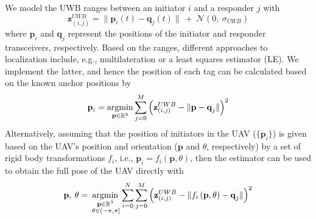 We model the UWB ranges between an initiator $i$ and a responder $j$ with
\begin{equation}
    \textbf{z}^{UWB}_{(i,j)} = \lVert \textbf{p}_i(t)-\textbf{q}_j(t) \lVert\:+\: \mathcal{N}\left(0,\:\sigma_{UWB}\right)
\end{equation}
where $\textbf{p}_i$ and $\textbf{q}_j$ represent the positions of the initiator and responder transceivers, respectively. Based on the ranges, different approaches to localization include, e.g., multilateration or a least squares estimator (LE). We implement the latter, and hence the position of each tag can be calculated based on the known anchor positions by
\begin{equation}
    \textbf{p}_{i} = \operatorname*{argmin}_{\textbf{p}\in\mathbb{R}^3} \displaystyle\sum_{j=0}^{M} \left(\textbf{z}^{UWB}_{(i,j)} - \lVert \textbf{p} - \textbf{q}_j \lVert \right)^2 
\end{equation}
Alternatively, assuming that the position of initiators in the UAV ($\{\textbf{p}_i\}$) is given based on the UAV's position and orientation ($\textbf{p}$ and $\theta$, respectively) by a set of rigid body transformations $f_i$, i.e., $\textbf{p}_i = f_i\left(\textbf{p}, \theta\right)$, then the estimator can be used to obtain the full pose of the UAV directly with
\begin{equation}
    \textbf{p}, \:\theta = \operatorname*{argmin}_{\substack{\textbf{p}\in\mathbb{R}^3\\\:\theta\in(-\pi,\pi]}} \displaystyle\sum_{i=0}^{N}\displaystyle\sum_{j=0}^{M} \left(\textbf{z}^{UWB}_{(i,j)} - \lVert f_i\left(\textbf{p}, \theta\right) - \textbf{q}_j \lVert \right)^2
\end{equation}


